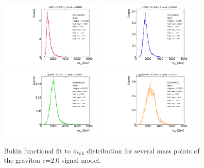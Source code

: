 \begin{figure}[!h]
\begin{center}
\includegraphics*[width=0.45\textwidth]{./figures/boosted/SigInterpolation/GravitonFit_Ghh1000C20_Bukin}
\includegraphics*[width=0.45\textwidth]{./figures/boosted/SigInterpolation/GravitonFit_Ghh1500C20_Bukin}\\
\includegraphics*[width=0.45\textwidth]{./figures/boosted/SigInterpolation/GravitonFit_Ghh2000C20_Bukin}
\includegraphics*[width=0.45\textwidth]{./figures/boosted/SigInterpolation/GravitonFit_Ghh3000C20_Bukin}
\caption{Bukin functional fit to $m_{hh}$ distribution for several mass points of the graviton c=2.0 signal model.}
\label{fig:boosted_siginter_bukinfit_c20}
\end{center}
\end{figure}
\FloatBarrier

